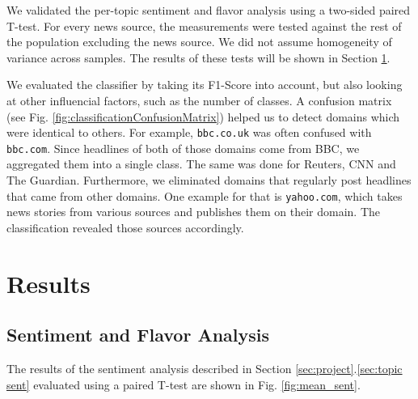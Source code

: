 \documentclass[final]{ieee}
\begin{document}
We validated the per-topic sentiment and flavor analysis using a two-sided paired T-test. For every news source, the measurements were tested against the rest of the population excluding the news source. We did not assume homogeneity of variance across samples. The results of these tests will be shown in Section \ref{sec:results}.

We evaluated the classifier by taking its F1-Score into account, but also looking at other influencial factors, such as the number of classes. A confusion matrix (see Fig. \ref{fig:classificationConfusionMatrix}) helped us to detect domains which were identical to others. For example, \texttt{bbc.co.uk} was often confused with \texttt{bbc.com}. Since headlines of both of those domains come from BBC, we aggregated them into a single class. The same was done for Reuters, CNN and The Guardian. Furthermore, we eliminated domains that regularly post headlines that came from other domains. One example for that is \texttt{yahoo.com}, which takes news stories from various sources and publishes them on their domain. The classification revealed those sources accordingly.

\section{Results}\label{sec:results}



\subsection{Sentiment and Flavor Analysis}

The results of the sentiment analysis described in Section \ref{sec:project}.\ref{sec:topic sent} evaluated using a paired T-test are shown in Fig. \ref{fig:mean_sent}.

\end{document}
